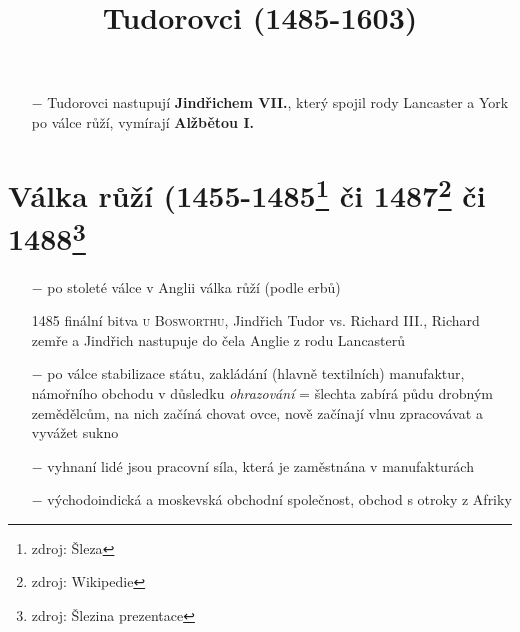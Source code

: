 \documentclass{article}
\title{\vspace{-2cm}Tudorovci (1485-1603)\vspace{-1.7cm}}
\date{}
\author{}
\begin{document}
\maketitle

\begin{itemize}
    \vspace{-0.5em}
    \setlength\itemsep{0.15em}
    \item[$-$] Tudorovci nastupují \textbf{Jindřichem VII.}, který spojil rody Lancaster a York po válce růží, vymírají \textbf{Alžbětou I.}
\end{itemize}

\section*{Válka růží (1455-1485\footnote{zdroj: Šleza} či 1487\footnote{zdroj: Wikipedie} či 1488\footnote{zdroj: Šlezina prezentace}}
\begin{itemize}
    \vspace{-0.5em}
    \setlength\itemsep{0.15em}
    \item[$-$] po stoleté válce v Anglii válka růží (podle erbů)
    \item[1485] finální bitva \textsc{u Bosworthu}, Jindřich Tudor vs. Richard III., Richard zemře a Jindřich nastupuje do čela Anglie z rodu Lancasterů
    \item[$-$] po válce stabilizace státu, zakládání (hlavně textilních) manufaktur, námořního obchodu v důsledku \textit{ohrazování} = šlechta zabírá půdu drobným zemědělcům, na nich začíná chovat ovce, nově začínají vlnu zpracovávat a vyvážet sukno
    \item[$-$] vyhnaní lidé jsou pracovní síla, která je zaměstnána v manufakturách
    \item[$-$] východoindická a moskevská obchodní společnost, obchod s otroky z Afriky
\end{itemize}
\end{document}
